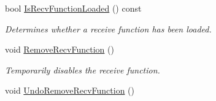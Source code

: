 \begin{DoxyCompactItemize}
bool \hyperlink{class_net_socket_a8eca2a547a5e1e613f782edc3fe8b910}{IsRecvFunctionLoaded} () const 
\begin{DoxyCompactList}\small\item\em Determines whether a receive function has been loaded. \item\end{DoxyCompactList}\item 
void \hyperlink{class_net_socket_afb09f225fda4d4b8f1108cb6c1e6b3d9}{RemoveRecvFunction} ()
\begin{DoxyCompactList}\small\item\em Temporarily disables the receive function. \item\end{DoxyCompactList}\item 
\hypertarget{class_net_socket_a0da1e270db405a2a49cb66670fbb2fbd}{
void \hyperlink{class_net_socket_a0da1e270db405a2a49cb66670fbb2fbd}{UndoRemoveRecvFunction} ()}
\label{class_net_socket_a0da1e270db405a2a49cb66670fbb2fbd}


\end{DoxyCompactItemize}
